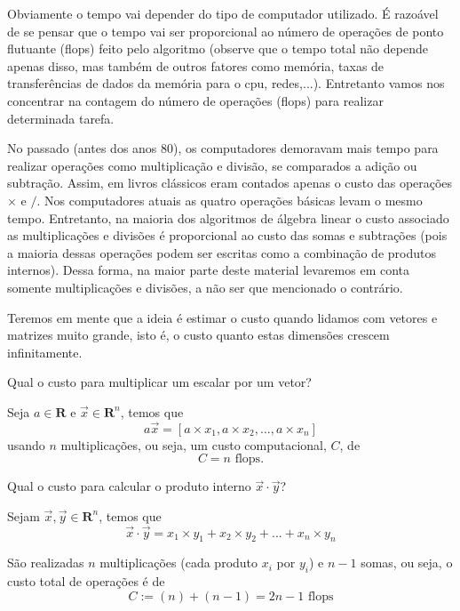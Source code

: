 Obviamente o tempo vai depender do tipo de computador utilizado. É razoável de se pensar que o tempo vai ser proporcional ao número de operações de ponto flutuante (flops) feito pelo algoritmo (observe que o tempo total não depende apenas disso, mas também de outros fatores como memória, taxas de transferências de dados da memória para o cpu, redes,...). Entretanto vamos nos concentrar na contagem do número de operações (flops) para realizar determinada tarefa.

No passado (antes dos anos 80), os computadores demoravam mais tempo para realizar operações como multiplicação e divisão, se comparados a adição ou subtração. Assim, em livros clássicos eram contados apenas o custo das operações $\times$ e $/$. Nos computadores atuais as quatro operações básicas  levam o mesmo tempo. Entretanto, na maioria dos algoritmos de álgebra linear o custo associado as multiplicações e divisões é proporcional ao custo das somas e subtrações (pois a maioria dessas operações podem ser escritas como a combinação de produtos internos). Dessa forma, na maior parte deste material levaremos em conta somente multiplicações e divisões, a não ser que mencionado o contrário.

Teremos em mente que a ideia é estimar o custo quando lidamos com vetores e matrizes muito grande, isto é, o custo quanto estas dimensões crescem infinitamente.

\begin{ex}
Qual o custo para multiplicar um escalar por um vetor?
\end{ex}
\begin{sol}
Seja $a \in \mathbf{R}$ e $\vec{x} \in \mathbf{R}^n$, temos que
\begin{equation}
  a \vec{x} = [a\times x_1 , a\times x_2 , ... ,a\times x_n]
\end{equation}
usando $n$ multiplicações, ou seja, um custo computacional, $C$, de
\begin{equation}
  C = n \text{~flops}.
\end{equation}
\end{sol}

\begin{ex}
Qual o custo para calcular o produto interno $\vec{x}\cdot\vec{y}$?
\end{ex}
\begin{sol}
Sejam $\vec{x}, \vec{y} \in \mathbf{R}^n$, temos que
\begin{equation}
  \vec{x}\cdot\vec{y} = x_1 \times y_1 + x_2\times y_2 + ... +x_n\times y_n
\end{equation}

São realizadas $n$ multiplicações (cada produto $x_i$ por $y_i$) e $n-1$ somas, ou seja, o custo total de operações é de
\begin{equation}
  C := (n)+(n-1) = 2n-1 \text{~flops}
\end{equation}
\end{sol}


